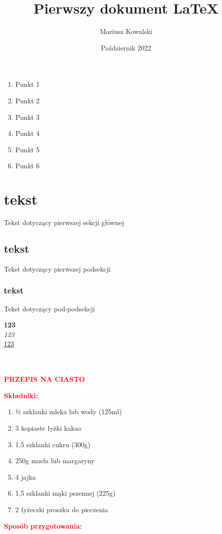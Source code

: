 \documentclass[12pt, letterpaper, titlepage]{article}
\title{Pierwszy dokument LaTeX}
\author{Mariusz Kowalski}
\date{Październik 2022}
\begin{document}
\maketitle
\begin{enumerate}[I]
\item Punkt 1
\item Punkt 2
\item Punkt 3
\item Punkt 4
\item Punkt 5
\item Punkt 6
\end{enumerate}
\section{tekst}
Tekst dotyczący pierwszej sekcji głównej
\subsection{tekst}
Tekst dotyczący pierwszej podsekcji
\subsubsection{tekst}
Tekst dotyczący pod-podsekcji

\textbf{123}\\
\textit{123}\\
\underline{123}\\
\\
\\

\clearpage
\begin{center}
{\Huge \textcolor {red} {\textbf{PRZEPIS NA CIASTO}}}
\end{center}

\textcolor {red} {\textbf{Składniki:}}

\begin{enumerate} [-]
\item ½ szklanki mleka lub wody (125ml)
\item 3 kopiaste łyżki kakao
\item 1,5 szklanki cukru (300g)
\item 250g masła lub margaryny
\item 4 jajka
\item 1,5 szklanki mąki pszennej (225g)
\item 2 łyżeczki proszku do pieczenia
\end{enumerate}

\textcolor {red} {\textbf{Sposób przygotowania:}}
\end{document}
